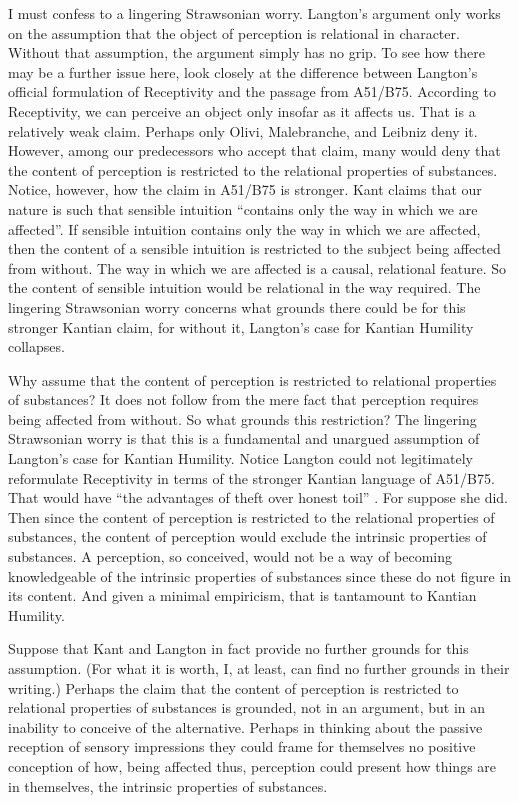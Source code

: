I must confess to a lingering Strawsonian worry. Langton's argument only works on the assumption that the object of perception is relational in character. Without that assumption, the argument simply has no grip. To see how there may be a further issue here, look closely at the difference between Langton's official formulation of Receptivity and the passage from A51/B75. According to Receptivity, we can perceive an object only insofar as it affects us. That is a relatively weak claim. Perhaps only Olivi, Malebranche, and Leibniz deny it. However, among our predecessors who accept that claim, many would deny that the content of perception is restricted to the relational properties of substances. Notice, however, how the claim in A51/B75 is stronger. Kant claims that our nature is such that sensible intuition ``contains only the way in which we are affected''. If sensible intuition contains only the way in which we are affected, then the content of a sensible intuition is restricted to the subject being affected from without. The way in which we are affected is a causal, relational feature. So the content of sensible intuition would be relational in the way required. The lingering Strawsonian worry concerns what grounds there could be for this stronger Kantian claim, for without it, Langton's case for Kantian Humility collapses. 

Why assume that the content of perception is restricted to relational properties of substances? It does not follow from the mere fact that perception requires being affected from without. So what grounds this restriction? The lingering Strawsonian worry is that this is a fundamental and unargued assumption of Langton's case for Kantian Humility. Notice Langton could not legitimately reformulate Receptivity in terms of the stronger Kantian language of A51/B75. That would have ``the advantages of theft over honest toil'' \citep[71]{Russell1919Introduction-to}. For suppose she did. Then since the content of perception is restricted to the relational properties of substances, the content of perception would exclude the intrinsic properties of substances. A perception, so conceived, would not be a way of becoming knowledgeable of the intrinsic properties of substances since these do not figure in its content. And given a minimal empiricism, that is tantamount to Kantian Humility. 

Suppose that Kant and Langton in fact provide no further grounds for this assumption. (For what it is worth, I, at least, can find no further grounds in their writing.) Perhaps the claim that the content of perception is restricted to relational properties of substances is grounded, not in an argument, but in an inability to conceive of the alternative. Perhaps in thinking about the passive reception of sensory impressions they could frame for themselves no positive conception of how, being affected thus, perception could present how things are in themselves, the intrinsic properties of substances.

